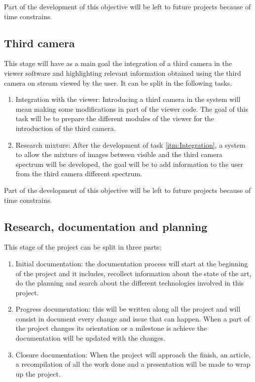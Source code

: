 \documentclass[10pt,a4paper,twocolumn,twoside]{article}
\begin{document}
	Part of the development of this objective will be left to future projects because of time constrains.
	
	\subsection{Third camera}
	This stage will have as a main goal the integration of a third camera in the viewer software and highlighting relevant information obtained using the third camera on stream viewed by the user. It can be split in the following tasks.
	
	\begin{enumerate}
		\item \label{itm:Integration} Integration with the viewer: Introducing a third camera in the system will mean making some modifications in part of the viewer code. The goal of this task will be to prepare the different modules of the viewer for the introduction of the third camera.
		
		\item Research mixture: After the development of task \ref{itm:Integration}, a system to allow the mixture of images between visible and the third camera spectrum will be developed, the goal will be to add information to the user from the third camera different spectrum.
	\end{enumerate}
	
	Part of the development of this objective will be left to future projects because of time constrains.
	
	
	\subsection{Research, documentation and planning}
	This stage of the project can be split in three parts:
	\begin{enumerate}
		\item Initial documentation: the documentation process will start at the beginning of the project and it includes, recollect information about the state of the art, do the planning and search about the different technologies involved in this project. 
		
		\item Progress documentation: this will be written along all the project and will consist in document every change and issue that can happen. When a part of the project changes its orientation or a milestone is achieve the documentation will be updated with the changes. 
		
		\item Closure documentation: When the project will approach the finish, an article, a recompilation of all the work done and a presentation will be made to wrap up the project.
		
	\end{enumerate}
	
\end{document}
